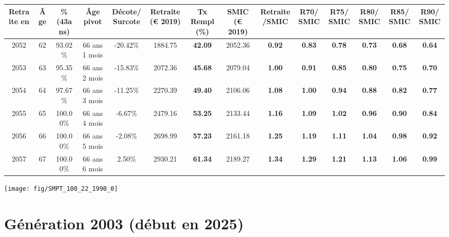 \begin{adjustbox}{max width=\textwidth} 
\begin{tabular}[htb]{|c|c||c|c|c||c|c||c|c||c|c|c|c|c|} 
\hline 
 Retraite en &  Âge &  \%(43ans) &  Âge pivot &  Décote/Surcote &  Retraite (\euro{} 2019) &  Tx Rempl(\%) &  SMIC (\euro{} 2019) &  Retraite/SMIC &  R70/SMIC &  R75/SMIC &  R80/SMIC &  R85/SMIC &  R90/SMIC \\ 
\hline \hline 
 2052 &  62 &  93.02\% &  66 ans 1 mois &  -20.42\% &  1884.75 &  {\bf 42.09} &  2052.36 &  {\bf {\color{red} 0.92}} &  {\bf {\color{red} 0.83}} &  {\bf {\color{red} 0.78}} &  {\bf {\color{red} 0.73}} &  {\bf {\color{red} 0.68}} &  {\bf {\color{red} 0.64}} \\ 
\hline 
 2053 &  63 &  95.35\% &  66 ans 2 mois &  -15.83\% &  2072.36 &  {\bf 45.68} &  2079.04 &  {\bf {\color{red} 1.00}} &  {\bf {\color{red} 0.91}} &  {\bf {\color{red} 0.85}} &  {\bf {\color{red} 0.80}} &  {\bf {\color{red} 0.75}} &  {\bf {\color{red} 0.70}} \\ 
\hline 
 2054 &  64 &  97.67\% &  66 ans 3 mois &  -11.25\% &  2270.39 &  {\bf 49.40} &  2106.06 &  {\bf 1.08} &  {\bf {\color{red} 1.00}} &  {\bf {\color{red} 0.94}} &  {\bf {\color{red} 0.88}} &  {\bf {\color{red} 0.82}} &  {\bf {\color{red} 0.77}} \\ 
\hline 
 2055 &  65 &  100.00\% &  66 ans 4 mois &  -6.67\% &  2479.16 &  {\bf 53.25} &  2133.44 &  {\bf 1.16} &  {\bf 1.09} &  {\bf 1.02} &  {\bf {\color{red} 0.96}} &  {\bf {\color{red} 0.90}} &  {\bf {\color{red} 0.84}} \\ 
\hline 
 2056 &  66 &  100.00\% &  66 ans 5 mois &  -2.08\% &  2698.99 &  {\bf 57.23} &  2161.18 &  {\bf 1.25} &  {\bf 1.19} &  {\bf 1.11} &  {\bf 1.04} &  {\bf {\color{red} 0.98}} &  {\bf {\color{red} 0.92}} \\ 
\hline 
 2057 &  67 &  100.00\% &  66 ans 6 mois &  2.50\% &  2930.21 &  {\bf 61.34} &  2189.27 &  {\bf 1.34} &  {\bf 1.29} &  {\bf 1.21} &  {\bf 1.13} &  {\bf 1.06} &  {\bf {\color{red} 0.99}} \\ 
\hline 
\hline 
\end{tabular} 
\end{adjustbox} 
 
 \vspace{0.1cm} 

 {\hspace{-2.2cm}\texttt{[image: fig/SMPT\_100\_22\_1990\_0]}} 

\newpage 
 
\section{Génération 2003 (début en 2025)\label{SMPT_100_22_2003_0}} 
 
